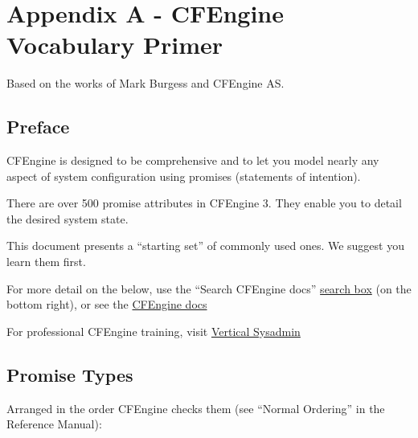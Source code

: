 



\chapter{Appendix A - CFEngine Vocabulary Primer}

Based on the works of Mark Burgess and CFEngine AS.

\section{Preface}

CFEngine is designed to be comprehensive and to let you model
nearly any aspect of system configuration using promises
(statements of intention).

There are over 500 promise attributes in CFEngine 3.
They enable you to detail the desired system state.

This document presents a ``starting set'' of commonly
used ones. We suggest you learn them first.

For more detail on the below, use the ``Search CFEngine docs''
\href{http://cf-learn.info/}{search box} (on the bottom right),
or see the \href{https://cfengine.com/docs/}{CFEngine docs}

For professional CFEngine training, visit \href{http://www.verticalsysadmin.com}{Vertical Sysadmin}

\section{Promise Types}

Arranged in the order CFEngine checks them (see ``Normal Ordering'' in the Reference Manual):

